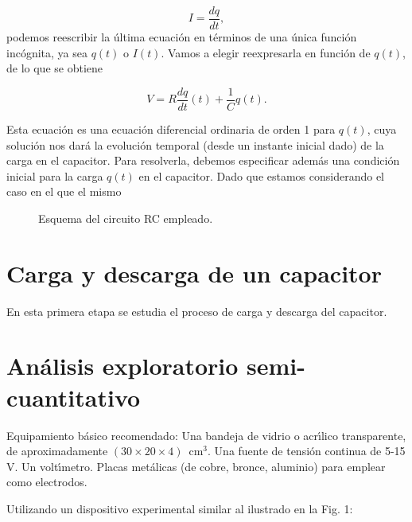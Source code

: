 \documentclass[laboratorio]{guia}
\begin{document}
$$ I = \frac{dq}{dt}, $$
podemos reescribir la \'ultima ecuaci\'on en t\'erminos de una \'unica
funci\'on inc\'ognita, ya sea $q(t)$ o $I(t)$. Vamos a elegir reexpresarla en
funci\'on de $q(t)$, de lo que se obtiene

\begin{equation}
    V = R \frac{dq}{dt}(t) + \frac{1}{C} q(t).
\end{equation}

Esta ecuaci\'on es una ecuaci\'on diferencial ordinaria de orden 1 para $q(t)$, 
cuya soluci\'on nos dar\'a la evoluci\'on temporal (desde un instante inicial
dado) de la carga en el capacitor. 
Para resolverla, debemos especificar adem\'as una condici\'on inicial para la 
carga $q(t)$ en el capacitor. Dado que estamos considerando el caso en el que
el mismo 

\begin{figure}[t!]
    \centering
    \vspace{0.5cm}
    \caption{Esquema del circuito RC empleado.}
    \label{fig:circuitoRC}
\end{figure}

\section{Carga y descarga de un capacitor}

En esta primera etapa se estudia el proceso de carga y descarga del capacitor.




\section{An\'alisis exploratorio semi-cuantitativo}

Equipamiento b\'asico recomendado: Una bandeja de vidrio o acr\'\i lico transparente, de aproximadamente $(30 \times 20 \times 4)$~cm$^3$. Una fuente de tensi\'on continua de 5-15 V. Un volt\'\i metro. Placas met\'alicas (de cobre, bronce, aluminio) para emplear como electrodos.

Utilizando un dispositivo experimental similar al ilustrado en la Fig. 1: 
\end{document}
